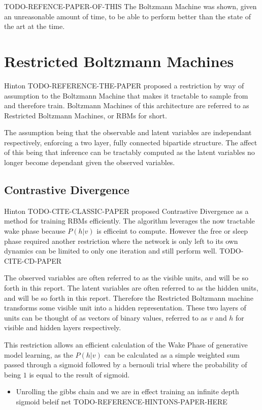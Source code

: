 TODO-REFENCE-PAPER-OF-THIS The Boltzmann Machine was shown, given an unreasonable amount of time, to be able to perform better than the state of the art at the time.

\section{Restricted Boltzmann Machines}

Hinton TODO-REFERENCE-THE-PAPER proposed a restriction by way of assumption to the Boltzmann Machine that makes it tractable to sample from and therefore train. Boltzmann Machines of this architecture are referred to as Restricted Boltzmann Machines, or RBMs for short.

The assumption being that the observable and latent variables are independant respectively, enforcing a two layer, fully connected bipartide structure. The affect of this being that inference can be tractably computed as the latent variables no longer become dependant given the observed variables.

  \subsection{Contrastive Divergence}
  Hinton TODO-CITE-CLASSIC-PAPER proposed Contrastive Divergence as a method for training RBMs efficiently. The algorithm leverages the now tractable wake phase because $P(h|v)$ is efficeint to compute. However the free or sleep phase required another restriction where the network is only left to its own dynamics can be limited to only one iteration and still perform well. TODO-CITE-CD-PAPER

The observed variables are often referred to as the visible units, and will be so forth in this report. The latent variables are often referred to as the hidden units, and will be so forth in this report. Therefore the Restricted Boltzmann machine transforms some visible unit into a hidden representation. These two layers of units can be thought of as vectors of binary values, referred to as $ v $ and $ h $ for visible and hidden layers respectively.

This restriction allows an efficient calculation of the Wake Phase of generative model learning, as the $ P(h|v) $ can be calculated as a simple weighted sum passed through a sigmoid followed by a bernouli trial where the probability of being $1$ is equal to the result of sigmoid.

\begin{itemize}
  \item Unrolling the gibbs chain and we are in effect training an infinite depth sigmoid beleif net TODO-REFERENCE-HINTONS-PAPER-HERE
\end{itemize}

